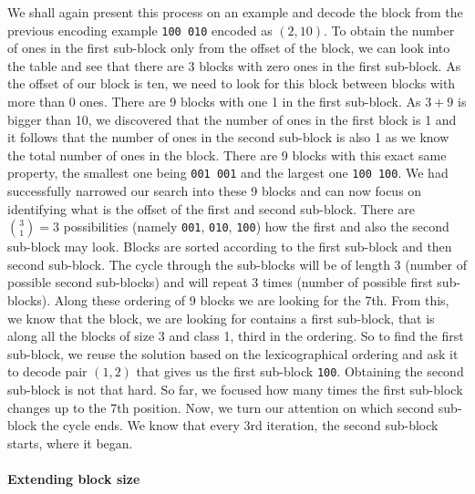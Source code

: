 We shall again present this process on an example and decode the block from the previous
encoding example {\tt 100 010} encoded as $(2, 10)$. To obtain the number of ones in
the first sub-block only from the offset of the block, we can look into the table and
see that there are 3 blocks with zero ones in the first sub-block. As the offset of our
block is ten, we need to look for this block between blocks with more than 0 ones. There
are 9 blocks with one 1 in the first sub-block. As $3+9$ is bigger than 10, we discovered
that the number of ones in the first block is 1 and it follows that the number of ones in
the second sub-block is
also 1 as we know the total number of ones in the block. There are 9 blocks with
this exact same property, the smallest one being {\tt 001 001} and the largest one
{\tt 100 100}. We had successfully narrowed our search into these 9 blocks and can now
focus on identifying what is the offset of the first and second sub-block. There are
${3 \choose 1} = 3$ possibilities (namely {\tt 001}, {\tt 010}, {\tt 100}) how the first
and also the second sub-block may look. Blocks are sorted according
to the first sub-block and then second sub-block. The cycle through
the sub-blocks will be of length 3 (number of possible second sub-blocks) and will repeat
3 times (number of possible first sub-blocks). Along these ordering of 9 blocks we are
looking for the 7th. From this, we know that the block, we are looking for contains a
first sub-block, that is along all the blocks of size 3 and class 1, third in the ordering.
So to find the first sub-block, we reuse the solution based on the lexicographical ordering
and ask it to decode pair $(1, 2)$ that gives us the first sub-block {\tt 100}. Obtaining
the second sub-block is not that hard. So far, we focused how many times the first sub-block
changes up to the 7th position. Now, we turn our attention on which second sub-block the cycle
ends. We know that every 3rd iteration, the second sub-block starts, where it began.

\paragraph{Extending block size}

